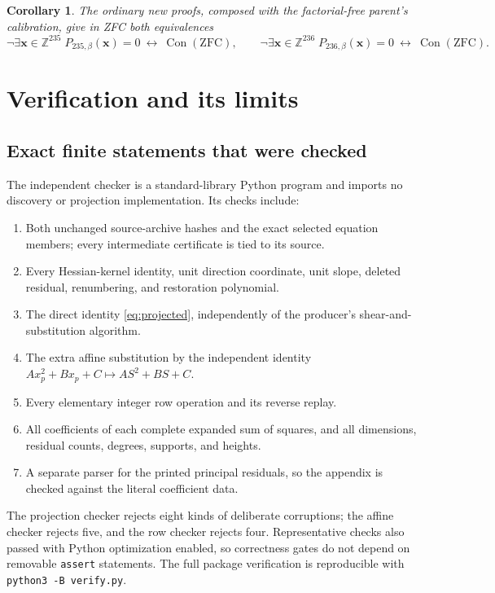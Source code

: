 \documentclass[10pt,letterpaper]{article}
\newtheorem{corollary}[theorem]{Corollary}
\theoremstyle{definition}\newtheorem{remark}[theorem]{Remark}
\newcommand{\Z}{\mathbb Z}\newcommand{\Q}{\mathbb Q}\newcommand{\N}{\mathbb N}
\newcommand{\Con}{\operatorname{Con}}
\newcommand{\BP}{P_{\mathrm{235},\beta}}
\newcommand{\SP}{P_{\mathrm{236},\beta}}
\begin{document}
\begin{corollary}
The ordinary new proofs, composed with the factorial-free parent's
calibration, give in ZFC both equivalences
\[
 \neg\exists\boldsymbol x\in\Z^{235}\;\BP(\boldsymbol x)=0
       \ \longleftrightarrow\ \Con(\mathrm{ZFC}),
 \qquad
 \neg\exists\boldsymbol x\in\Z^{236}\;\SP(\boldsymbol x)=0
       \ \longleftrightarrow\ \Con(\mathrm{ZFC}).
\]
\end{corollary}

\section{Verification and its limits}

\subsection{Exact finite statements that were checked}

The independent checker is a standard-library Python program and imports
no discovery or projection implementation. Its checks include:
\begin{enumerate}
\item Both unchanged source-archive hashes and the exact selected equation
      members; every intermediate certificate is tied to its source.
\item Every Hessian-kernel identity, unit direction coordinate, unit slope,
      deleted residual, renumbering, and restoration polynomial.
\item The direct identity \eqref{eq:projected}, independently of the
      producer's shear-and-substitution algorithm.
\item The extra affine substitution by the independent identity
      $A x_p^2+B x_p+C\mapsto A S^2+B S+C$.
\item Every elementary integer row operation and its reverse replay.
\item All coefficients of each complete expanded sum of squares, and all
      dimensions, residual counts, degrees, supports, and heights.
\item A separate parser for the printed principal residuals, so the
      appendix is checked against the literal coefficient data.
\end{enumerate}
The projection checker rejects eight kinds of deliberate corruptions;
the affine checker rejects five, and the row checker rejects four.
Representative checks also passed with Python optimization enabled, so
correctness gates do not depend on removable \texttt{assert} statements.
The full package verification is reproducible with
\texttt{python3 -B verify.py}.
\end{document}
